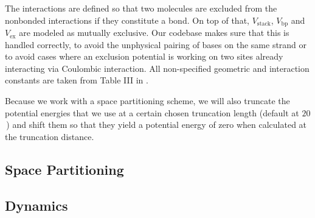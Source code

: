 The interactions are defined so that two molecules are excluded from the nonbonded interactions if they constitute a bond. On top of that, $V_\text{stack}$, $V_\text{bp}$ and $V_\text{ex}$ are modeled as mutually exclusive. Our codebase makes sure that this is handled correctly, to avoid the unphysical pairing of bases on the same strand or to avoid cases where an exclusion potential is working on two sites already interacting via Coulombic interaction. All non-specified geometric and interaction constants are taken from Table III in \cite{knotts2007coarse}.

Because we work with a space partitioning scheme, we will also truncate the potential energies that we use at a certain chosen truncation length (default at $20$\,\Angstrom) and shift them so that they yield a potential energy of zero when calculated at the truncation distance.

\subsection{Space Partitioning}



\subsection{Dynamics}
